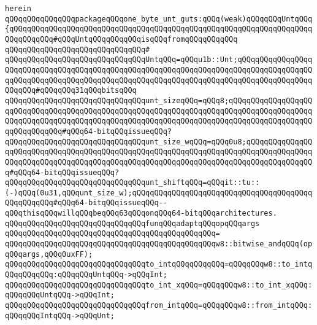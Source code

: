 \verb|herein|\newline
\newline
\verb|qQQqqQQqqQQqqQQqpackageqQQqone_byte_unt_guts:qQQq(weak)qQQqqQQqUntqQQq{qQQqqQQqqQQqqQQqqQQqqQQqqQQqqQQqqQQqqQQqqQQqqQQqqQQqqQQqqQQqqQQqqQQqqQQqqQQqqQQq#qQQqUntqQQqqQQqqQQqisqQQqfromqQQqqQQqqQQq|\newline
\verb|qQQqqQQqqQQqqQQqqQQqqQQqqQQqqQQq#|\newline
\verb|qQQqqQQqqQQqqQQqqQQqqQQqqQQqqQQqUntqQQq=qQQqu1b::Unt;qQQqqQQqqQQqqQQqqQQqqQQqqQQqqQQqqQQqqQQqqQQqqQQqqQQqqQQqqQQqqQQqqQQqqQQqqQQqqQQqqQQqqQQqqQQqqQQqqQQqqQQqqQQqqQQqqQQqqQQqqQQqqQQqqQQqqQQqqQQqqQQqqQQqqQQqqQQqqQQqqQQq#qQQqqQQq31qQQqbitsqQQq|\newline
\newline
\verb|qQQqqQQqqQQqqQQqqQQqqQQqqQQqqQQqunt_sizeqQQq=qQQq8;qQQqqQQqqQQqqQQqqQQqqQQqqQQqqQQqqQQqqQQqqQQqqQQqqQQqqQQqqQQqqQQqqQQqqQQqqQQqqQQqqQQqqQQqqQQqqQQqqQQqqQQqqQQqqQQqqQQqqQQqqQQqqQQqqQQqqQQqqQQqqQQqqQQqqQQqqQQqqQQqqQQqqQQqqQQq#qQQq64-bitqQQqissueqQQq?|\newline
\verb|qQQqqQQqqQQqqQQqqQQqqQQqqQQqqQQqunt_size_wqQQq=qQQq0u8;qQQqqQQqqQQqqQQqqQQqqQQqqQQqqQQqqQQqqQQqqQQqqQQqqQQqqQQqqQQqqQQqqQQqqQQqqQQqqQQqqQQqqQQqqQQqqQQqqQQqqQQqqQQqqQQqqQQqqQQqqQQqqQQqqQQqqQQqqQQqqQQqqQQqqQQqqQQq#qQQq64-bitqQQqissueqQQq?|\newline
\verb|qQQqqQQqqQQqqQQqqQQqqQQqqQQqqQQqunt_shiftqQQq=qQQqit::tu::(-)qQQq(0u31,qQQqunt_size_w);qQQqqQQqqQQqqQQqqQQqqQQqqQQqqQQqqQQqqQQqqQQqqQQqqQQq#qQQq64-bitqQQqissueqQQq--qQQqthisqQQqwillqQQqbeqQQq63qQQqonqQQq64-bitqQQqarchitectures.|\newline
\newline
\verb|qQQqqQQqqQQqqQQqqQQqqQQqqQQqqQQqfunqQQqadaptqQQqopqQQqargs|\newline
\verb|qQQqqQQqqQQqqQQqqQQqqQQqqQQqqQQqqQQqqQQqqQQqqQQq=|\newline
\verb|qQQqqQQqqQQqqQQqqQQqqQQqqQQqqQQqqQQqqQQqqQQqqQQqw8::bitwise_andqQQq(opqQQqargs,qQQq0uxFF);|\newline
\newline
\verb|qQQqqQQqqQQqqQQqqQQqqQQqqQQqqQQqto_intqQQqqQQqqQQq=qQQqqQQqw8::to_intqQQqqQQqqQQq:qQQqqQQqUntqQQq->qQQqInt;|\newline
\verb|qQQqqQQqqQQqqQQqqQQqqQQqqQQqqQQqto_int_xqQQq=qQQqqQQqw8::to_int_xqQQq:qQQqqQQqUntqQQq->qQQqInt;|\newline
\verb|qQQqqQQqqQQqqQQqqQQqqQQqqQQqqQQqfrom_intqQQq=qQQqqQQqw8::from_intqQQq:qQQqqQQqIntqQQq->qQQqUnt;|\newline
